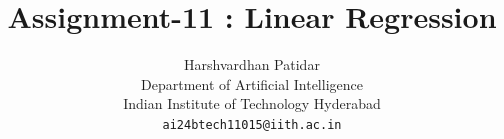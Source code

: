 \documentclass{article}
\title{Assignment-11 : Linear Regression}
\author{Harshvardhan Patidar\\
  Department of Artificial Intelligence\\
  Indian Institute of Technology Hyderabad\\
  \texttt{ai24btech11015@iith.ac.in}
}
\begin{document}
\



\maketitle






















\end{document}
